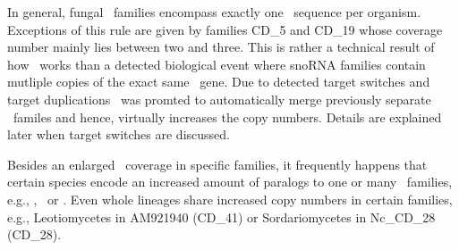 In general, fungal \sno\ families encompass exactly one \sno\ sequence
per organism. Exceptions of this rule are given by 
families CD\_5 and CD\_19 whose coverage number mainly lies between two and
three. This is rather a technical result of how \snostrip\ works than a
detected biological event where snoRNA families contain mutliple
copies of the exact same \sno\ gene. Due to detected target
switches and target duplications \snostrip\ was promted to
automatically merge previously separate \sno\ familes and hence,
virtually increases the copy numbers. Details are explained
later when target switches are discussed. 

Besides an enlarged
\sno\ coverage in specific families, it frequently happens that
certain species encode an increased amount of paralogs to one or
many \sno\ families, e.g., \Ppl, \Asp\ or \Nfu. Even
whole lineages share increased copy numbers in certain families, e.g., 
Leotiomycetes in AM921940 (CD\_41) or Sordariomycetes in Nc\_CD\_28 (CD\_28).

